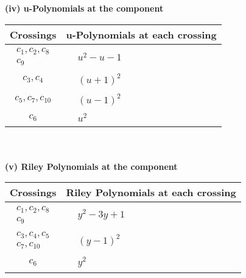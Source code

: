 \documentclass[1p]{elsarticle_modified}
\theoremstyle{definition}
\begin{document}
\newpage\renewcommand{\arraystretch}{1}
\flushleft \textbf{(iv) u-Polynomials at the component}\newline \\
\begin{tabular}{m{50pt}|m{274pt}}
Crossings & \hspace{64pt}u-Polynomials at each crossing \\
\hline $$\begin{aligned}c_{1},c_{2},c_{8}\\c_{9}\end{aligned}$$&$\begin{aligned}
&u^2- u-1
\end{aligned}$\\
\hline $$\begin{aligned}c_{3},c_{4}\end{aligned}$$&$\begin{aligned}
&(u+1)^2
\end{aligned}$\\
\hline $$\begin{aligned}c_{5},c_{7},c_{10}\end{aligned}$$&$\begin{aligned}
&(u-1)^2
\end{aligned}$\\
\hline $$\begin{aligned}c_{6}\end{aligned}$$&$\begin{aligned}
&u^2
\end{aligned}$\\
\hline
\end{tabular}\\~\\
\newpage\renewcommand{\arraystretch}{1}
\flushleft \textbf{(v) Riley Polynomials at the component}\newline \\
\begin{tabular}{m{50pt}|m{274pt}}
Crossings & \hspace{64pt}Riley Polynomials at each crossing \\
\hline $$\begin{aligned}c_{1},c_{2},c_{8}\\c_{9}\end{aligned}$$&$\begin{aligned}
&y^2-3 y+1
\end{aligned}$\\
\hline $$\begin{aligned}c_{3},c_{4},c_{5}\\c_{7},c_{10}\end{aligned}$$&$\begin{aligned}
&(y-1)^2
\end{aligned}$\\
\hline $$\begin{aligned}c_{6}\end{aligned}$$&$\begin{aligned}
&y^2
\end{aligned}$\\
\hline
\end{tabular}\\~\\
\end{document}
